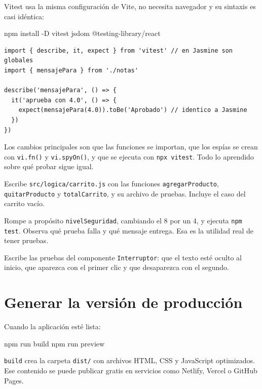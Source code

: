 \documentclass[11pt,a4paper]{article}
\newcommand{\cmd}[1]{\texttt{\color{reactdark}#1}}
\begin{document}
Vitest usa la misma configuración de Vite, no necesita navegador y su sintaxis es casi idéntica:
\begin{terminal}
npm install -D vitest jsdom @testing-library/react
\end{terminal}
\begin{lstlisting}[language=JSX]
import { describe, it, expect } from 'vitest' // en Jasmine son globales
import { mensajePara } from './notas'

describe('mensajePara', () => {
  it('aprueba con 4.0', () => {
    expect(mensajePara(4.0)).toBe('Aprobado') // identico a Jasmine
  })
})
\end{lstlisting}

Los cambios principales son que las funciones se importan, que los espías se crean con \cmd{vi.fn()} y \cmd{vi.spyOn()}, y que se ejecuta con \cmd{npx vitest}. Todo lo aprendido sobre qué probar sigue igual.

\begin{ejercicio}[de pruebas 1]
Escribe \cmd{src/logica/carrito.js} con las funciones \cmd{agregarProducto}, \cmd{quitarProducto} y \cmd{totalCarrito}, y su archivo de pruebas. Incluye el caso del carrito vacío.
\end{ejercicio}

\begin{ejercicio}[de pruebas 2]
Rompe a propósito \cmd{nivelSeguridad}, cambiando el 8 por un 4, y ejecuta \cmd{npm test}. Observa qué prueba falla y qué mensaje entrega. Esa es la utilidad real de tener pruebas.
\end{ejercicio}

\begin{ejercicio}[de pruebas 3]
Escribe las pruebas del componente \cmd{Interruptor}: que el texto esté oculto al inicio, que aparezca con el primer clic y que desaparezca con el segundo.
\end{ejercicio}


\section{Generar la versión de producción}

Cuando la aplicación esté lista:
\begin{terminal}
npm run build
npm run preview
\end{terminal}

\cmd{build} crea la carpeta \cmd{dist/} con archivos HTML, CSS y JavaScript optimizados. Ese contenido se puede publicar gratis en servicios como Netlify, Vercel o GitHub Pages.
\end{document}
